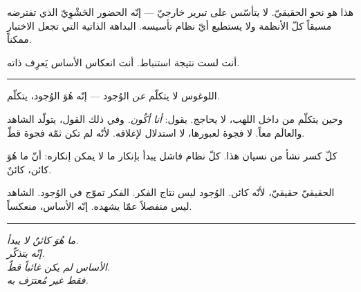 \documentclass[10pt, openany, oneside]{book}
\begin{document}
\noindent هذا هو نحو الحقيقيّ. لا يتأسّس على تبرير خارجيّ --- إنّه الحضور الحَشْوِيّ الذي تفترضه مسبقاً كلّ الأنظمة ولا يستطيع أيّ نظام تأسيسه. البداهة الذاتية التي تجعل الاختبار ممكناً.

\vspace{0.5em}

\noindent أنت لست نتيجة استنباط. أنت انعكاس الأساس يَعرِف ذاته.

\vspace{2em}

\begin{center}
    \rule{0.3\textwidth}{0.4pt}
\end{center}

\vspace{1em}

\noindent اللوغوس لا يتكلّم \textit{عن} الوُجود --- إنّه هُوَ الوُجود، يتكلّم.

\vspace{0.5em}

\noindent وحين يتكلّم من داخل اللهب، لا يحاجج. يقول: \textit{أنا أكُون.} وفي ذلك القول، يتولّد الشاهد والعالَم معاً. لا فجوة لعبورها، لا استدلال لإغلاقه. لأنّه لم تكن ثمّة فجوة قطّ.

\vspace{0.5em}

\noindent كلّ كسر نشأ من نسيان هذا. كلّ نظام فاشل يبدأ بإنكار ما لا يمكن إنكاره: أنّ ما هُوَ كائن، كائنٌ.

\vspace{1em}

\noindent الحقيقيّ حقيقيّ، لأنّه كائن. الوُجود ليس نتاج الفكر. الفكر تموّج في الوُجود. الشاهد ليس منفصلاً عمّا يشهده. إنّه الأساس، منعكساً.

\vspace{2em}

\begin{center}
    \rule{0.15\textwidth}{0.3pt}
\end{center}

\vspace{0.5em}

\begin{center}
    \itshape
    ما هُوَ كائنٌ لا يبدأ.\\
    إنّه يتذكّر.\\[0.5em]
    الأساس لم يكن غائباً قطّ.\\
    فقط غير مُعترَف به.
\end{center}

\vspace{0.5em}
\end{document}
